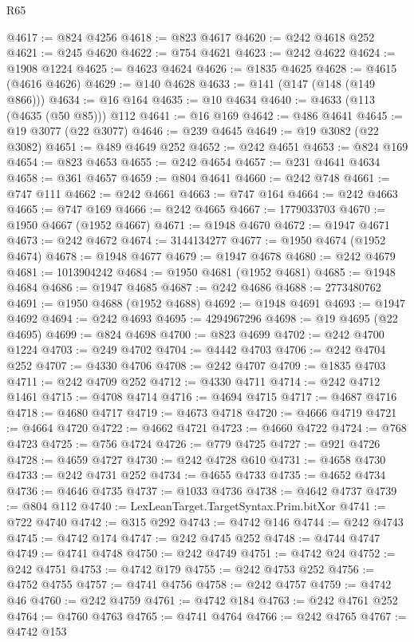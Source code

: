 \begin{lexlean}{R65}
\begin{coremodule}
{@4617 := @824 @4256
@4618 := @823 @4617
@4620 := @242 @4618 @252
@4621 := @245 @4620
@4622 := @754 @4621
@4623 := @242 @4622
@4624 := @1908 @1224
@4625 := @4623 @4624
@4626 := @1835 @4625
@4628 := @4615 (@4616 @4626)
@4629 := @140 @4628
@4633 := @141 (@147 (@148 (@149 @866)))
@4634 := @16 @164
@4635 := @10 @4634
@4640 := @4633 (@113 (@4635 (@50 @85))) @112
@4641 := @16 @169
@4642 := @486 @4641
@4645 := @19 @3077 (@22 @3077)
@4646 := @239 @4645
@4649 := @19 @3082 (@22 @3082)
@4651 := @489 @4649 @252
@4652 := @242 @4651
@4653 := @824 @169
@4654 := @823 @4653
@4655 := @242 @4654
@4657 := @231 @4641 @4634
@4658 := @361 @4657
@4659 := @804 @4641
@4660 := @242 @748
@4661 := @747 @111
@4662 := @242 @4661
@4663 := @747 @164
@4664 := @242 @4663
@4665 := @747 @169
@4666 := @242 @4665
@4667 := 1779033703
@4670 := @1950 @4667 (@1952 @4667)
@4671 := @1948 @4670
@4672 := @1947 @4671
@4673 := @242 @4672
@4674 := 3144134277
@4677 := @1950 @4674 (@1952 @4674)
@4678 := @1948 @4677
@4679 := @1947 @4678
@4680 := @242 @4679
@4681 := 1013904242
@4684 := @1950 @4681 (@1952 @4681)
@4685 := @1948 @4684
@4686 := @1947 @4685
@4687 := @242 @4686
@4688 := 2773480762
@4691 := @1950 @4688 (@1952 @4688)
@4692 := @1948 @4691
@4693 := @1947 @4692
@4694 := @242 @4693
@4695 := 4294967296
@4698 := @19 @4695 (@22 @4695)
@4699 := @824 @4698
@4700 := @823 @4699
@4702 := @242 @4700 @1224
@4703 := @249 @4702
@4704 := @4442 @4703
@4706 := @242 @4704 @252
@4707 := @4330 @4706
@4708 := @242 @4707
@4709 := @1835 @4703
@4711 := @242 @4709 @252
@4712 := @4330 @4711
@4714 := @242 @4712 @1461
@4715 := @4708 @4714
@4716 := @4694 @4715
@4717 := @4687 @4716
@4718 := @4680 @4717
@4719 := @4673 @4718
@4720 := @4666 @4719
@4721 := @4664 @4720
@4722 := @4662 @4721
@4723 := @4660 @4722
@4724 := @768 @4723
@4725 := @756 @4724
@4726 := @779 @4725
@4727 := @921 @4726
@4728 := @4659 @4727
@4730 := @242 @4728 @610
@4731 := @4658 @4730
@4733 := @242 @4731 @252
@4734 := @4655 @4733
@4735 := @4652 @4734
@4736 := @4646 @4735
@4737 := @1033 @4736
@4738 := @4642 @4737
@4739 := @804 @112
@4740 := LexLeanTarget.TargetSyntax.Prim.bitXor
@4741 := @722 @4740
@4742 := @315 @292
@4743 := @4742 @146
@4744 := @242 @4743
@4745 := @4742 @174
@4747 := @242 @4745 @252
@4748 := @4744 @4747
@4749 := @4741 @4748
@4750 := @242 @4749
@4751 := @4742 @24
@4752 := @242 @4751
@4753 := @4742 @179
@4755 := @242 @4753 @252
@4756 := @4752 @4755
@4757 := @4741 @4756
@4758 := @242 @4757
@4759 := @4742 @46
@4760 := @242 @4759
@4761 := @4742 @184
@4763 := @242 @4761 @252
@4764 := @4760 @4763
@4765 := @4741 @4764
@4766 := @242 @4765
@4767 := @4742 @153
}
\end{coremodule}
\end{lexlean}
